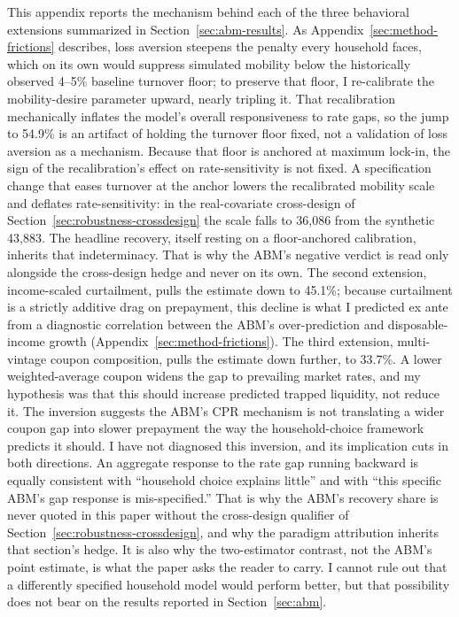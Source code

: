 \documentclass[12pt]{article}
\begin{document}
This appendix reports the mechanism behind each of the three behavioral extensions summarized in Section~\ref{sec:abm-results}. As Appendix~\ref{sec:method-frictions} describes, loss aversion steepens the penalty every household faces, which on its own would suppress simulated mobility below the historically observed 4--5\% baseline turnover floor; to preserve that floor, I re-calibrate the mobility-desire parameter upward, nearly tripling it. That recalibration mechanically inflates the model's overall responsiveness to rate gaps, so the jump to 54.9\% is an artifact of holding the turnover floor fixed, not a validation of loss aversion as a mechanism. Because that floor is anchored at maximum lock-in, the sign of the recalibration's effect on rate-sensitivity is not fixed. A specification change that eases turnover at the anchor lowers the recalibrated mobility scale and deflates rate-sensitivity: in the real-covariate cross-design of Section~\ref{sec:robustness-crossdesign} the scale falls to 36,086 from the synthetic 43,883. The headline recovery, itself resting on a floor-anchored calibration, inherits that indeterminacy. That is why the ABM's negative verdict is read only alongside the cross-design hedge and never on its own. The second extension, income-scaled curtailment, pulls the estimate down to 45.1\%; because curtailment is a strictly additive drag on prepayment, this decline is what I predicted ex ante from a diagnostic correlation between the ABM's over-prediction and disposable-income growth (Appendix~\ref{sec:method-frictions}). The third extension, multi-vintage coupon composition, pulls the estimate down further, to 33.7\%. A lower weighted-average coupon widens the gap to prevailing market rates, and my hypothesis was that this should increase predicted trapped liquidity, not reduce it. The inversion suggests the ABM's CPR mechanism is not translating a wider coupon gap into slower prepayment the way the household-choice framework predicts it should. I have not diagnosed this inversion, and its implication cuts in both directions. An aggregate response to the rate gap running backward is equally consistent with ``household choice explains little'' and with ``this specific ABM's gap response is mis-specified.'' That is why the ABM's recovery share is never quoted in this paper without the cross-design qualifier of Section~\ref{sec:robustness-crossdesign}, and why the paradigm attribution inherits that section's hedge. It is also why the two-estimator contrast, not the ABM's point estimate, is what the paper asks the reader to carry. I cannot rule out that a differently specified household model would perform better, but that possibility does not bear on the results reported in Section~\ref{sec:abm}.
\end{document}
